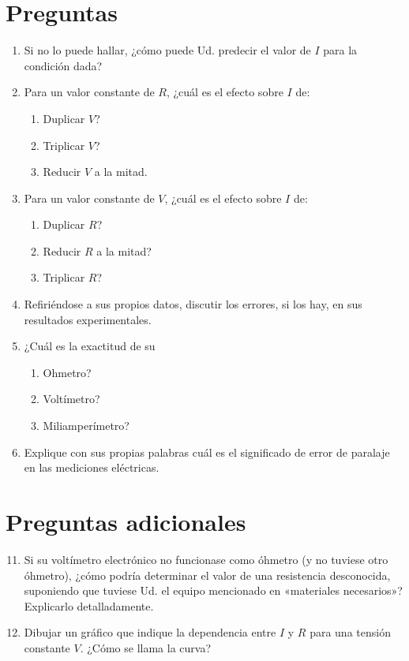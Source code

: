 \documentclass[12pt]{article}
\begin{document}
\section*{Preguntas}
\begin{enumerate}
    \item Si no lo puede hallar, ¿cómo puede Ud. predecir el valor de \( I \) para la condición dada?
    \item Para un valor constante de \( R \), ¿cuál es el efecto sobre \( I \) de:
    \begin{enumerate}
        \item Duplicar \( V \)?
        \item Triplicar \( V \)?
        \item Reducir \( V \) a la mitad.
    \end{enumerate}
    \item Para un valor constante de \( V \), ¿cuál es el efecto sobre \( I \) de:
    \begin{enumerate}
        \item Duplicar \( R \)?
        \item Reducir \( R \) a la mitad?
        \item Triplicar \( R \)?
    \end{enumerate}
    \item Refiriéndose a sus propios datos, discutir los errores, si los hay, en sus resultados experimentales.
    \item ¿Cuál es la exactitud de su
    \begin{enumerate}
        \item Ohmetro?
        \item Voltímetro?
        \item Miliamperímetro?
    \end{enumerate}
    \item Explique con sus propias palabras cuál es el significado de error de paralaje en las mediciones eléctricas.
\end{enumerate}

\section*{Preguntas adicionales}
\begin{enumerate}
    \setcounter{enumi}{10}
    \item Si su voltímetro electrónico no funcionase como óhmetro (y no tuviese otro óhmetro), ¿cómo podría determinar el valor de una resistencia desconocida, suponiendo que tuviese Ud. el equipo mencionado en «materiales necesarios»? Explicarlo detalladamente.
    \item Dibujar un gráfico que indique la dependencia entre \( I \) y \( R \) para una tensión constante \( V \). ¿Cómo se llama la curva?
\end{enumerate}
\end{document}
